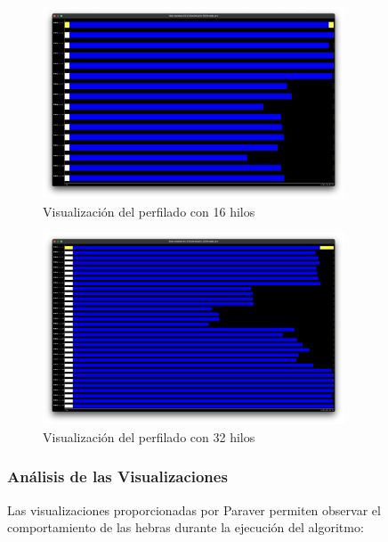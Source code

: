 \documentclass[a4paper, 10pt, onecolumn]{IEEEtran}
\begin{document}
\begin{figure}[H]
  \centering
  \includegraphics[width=0.8\textwidth]{./img/paraver-16threads.png}
  \caption{Visualización del perfilado con 16 hilos}
  \label{fig:paraver_16threads}
\end{figure}

\begin{figure}[H]
  \centering
  \includegraphics[width=0.8\textwidth]{./img/paraver-32threads.png}
  \caption{Visualización del perfilado con 32 hilos}
  \label{fig:paraver_32threads}
\end{figure}

\subsubsection{Análisis de las Visualizaciones}

Las visualizaciones proporcionadas por Paraver permiten observar el comportamiento de las hebras durante la ejecución del algoritmo:
\end{document}
